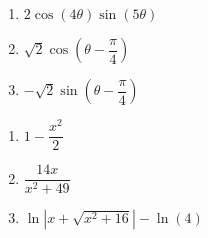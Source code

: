 \begin{multicols}{3}

\begin{enumerate}

\setcounter{enumi}{\value{HW}}

\item $2\cos(4\theta)\sin(5\theta)$
\item $\sqrt{2}\cos \left(\theta - \dfrac{\pi}{4} \right)$
\item $-\sqrt{2}\sin \left(\theta - \dfrac{\pi}{4} \right)$

\setcounter{HW}{\value{enumi}}

\end{enumerate}

\end{multicols}

\begin{multicols}{3}

\begin{enumerate}

\setcounter{enumi}{\value{HW}}

\addtocounter{enumi}{4}

\item $1 - \dfrac{x^{2}}{2}$

\item $\dfrac{14x}{x^{2} + 49}$

\item $\ln |x + \sqrt{x^{2} + 16}| - \ln(4)$ 

\setcounter{HW}{\value{enumi}}

\end{enumerate}

\end{multicols}

\closegraphsfile